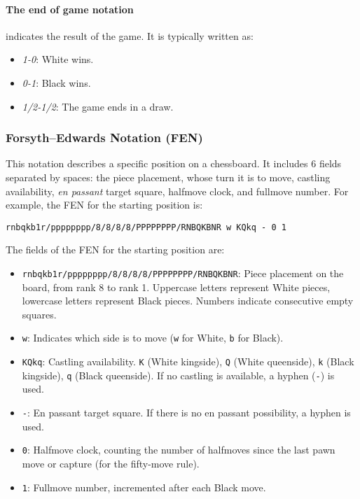 \paragraph{The end of game notation} indicates the result of the game. It is typically written as:

\begin{itemize}[itemsep=1pt]
    \item \textit{1-0}: White wins.
    \item \textit{0-1}: Black wins.
    \item \textit{1/2-1/2}: The game ends in a draw.
\end{itemize}

\subsubsection{Forsyth–Edwards Notation (FEN)}

This notation describes a specific position on a chessboard. It includes 6 fields separated by spaces: the piece placement, whose turn it is to move, castling availability, \textit{en passant} target square, halfmove clock, and fullmove number.
For example, the FEN for the starting position is:
\begin{verbatim}
rnbqkb1r/pppppppp/8/8/8/8/PPPPPPPP/RNBQKBNR w KQkq - 0 1
\end{verbatim}

\noindent The fields of the FEN for the starting position are:

\begin{itemize}[itemsep=1pt]
    \item \texttt{rnbqkb1r/pppppppp/8/8/8/8/PPPPPPPP/RNBQKBNR}: Piece placement on the board, from rank 8 to rank 1. Uppercase letters represent White pieces, lowercase letters represent Black pieces. Numbers indicate consecutive empty squares.
    \item \texttt{w}: Indicates which side is to move (\texttt{w} for White, \texttt{b} for Black).
    \item \texttt{KQkq}: Castling availability. \texttt{K} (White kingside), \texttt{Q} (White queenside), \texttt{k} (Black kingside), \texttt{q} (Black queenside). If no castling is available, a hyphen (\texttt{-}) is used.
    \item \texttt{-}: En passant target square. If there is no en passant possibility, a hyphen is used.
    \item \texttt{0}: Halfmove clock, counting the number of halfmoves since the last pawn move or capture (for the fifty-move rule).
    \item \texttt{1}: Fullmove number, incremented after each Black move.
\end{itemize}

